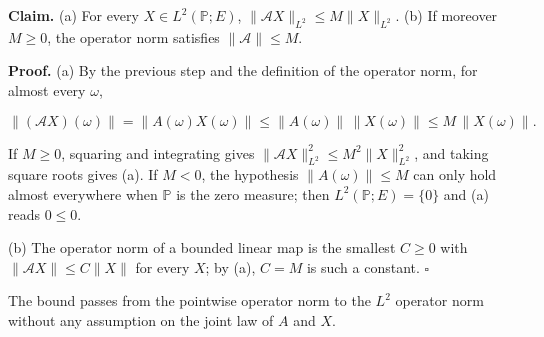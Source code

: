 \documentclass[11pt,a4paper]{article}
\begin{document}
\textbf{Claim.} (a) For every \(X\in L^2(\mathbb P;E)\), \(\|\mathcal AX\|_{L^2}\le M\|X\|_{L^2}\). (b) If moreover \(M\ge0\), the operator norm satisfies \(\|\mathcal A\|\le M\).




\textbf{Proof.} (a) By the previous step and the definition of the operator norm, for almost every \(\omega\),


\[\|(\mathcal AX)(\omega)\|=\|A(\omega)X(\omega)\|\le\|A(\omega)\|\,\|X(\omega)\|\le M\,\|X(\omega)\|.\]


If \(M\ge0\), squaring and integrating gives \(\|\mathcal AX\|_{L^2}^2\le M^2\|X\|_{L^2}^2\), and taking square roots gives (a). If \(M<0\), the hypothesis \(\|A(\omega)\|\le M\) can only hold almost everywhere when \(\mathbb P\) is the zero measure; then \(L^2(\mathbb P;E)=\{0\}\) and (a) reads \(0\le0\).




(b) The operator norm of a bounded linear map is the smallest \(C\ge0\) with \(\|\mathcal AX\|\le C\|X\|\) for every \(X\); by (a), \(C=M\) is such a constant. \(\square\)




The bound passes from the pointwise operator norm to the \(L^2\) operator norm without any assumption on the joint law of \(A\) and \(X\).
\end{document}

